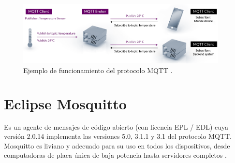 \begin{itemize}
\begin{figure}[htbp]
	\centering
	\includegraphics[width=0.95\textwidth]{./Figures/mqtt.png}
	\caption{Ejemplo de funcionamiento del protocolo MQTT \protect\footnotemark.}
	\label{fig:mqtt}
\end{figure}


\end{itemize}





\section{Eclipse Mosquitto} 
Es un agente de mensajes de código abierto (con licencia EPL / EDL) cuya versión 2.0.14 implementa las versiones 5.0, 3.1.1 y 3.1 del protocolo MQTT. Mosquitto es liviano y adecuado para su uso en todos los dispositivos, desde computadoras de placa única de baja potencia hasta servidores completos \citep{WEBSITE:5}.



